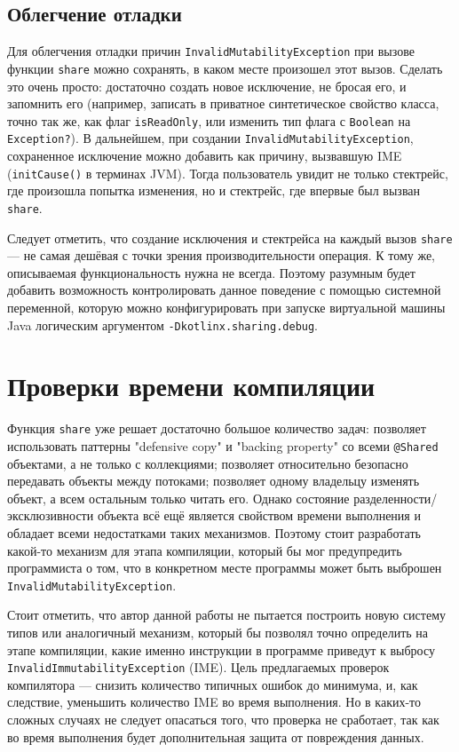 \documentclass[specification,annotation,times]{itmo-student-thesis}
\begin{document}
\subsection{Облегчение отладки}

Для облегчения отладки причин \texttt{InvalidMutabilityException} при вызове функции \texttt{share} можно сохранять, в каком месте произошел этот вызов.
Сделать это очень просто: достаточно создать новое исключение, не бросая его, и запомнить его (например, записать в приватное синтетическое свойство класса, точно так же, как флаг \texttt{isReadOnly}, или изменить тип флага с \texttt{Boolean} на \texttt{Exception?}).
В дальнейшем, при создании \texttt{InvalidMutabilityException}, сохраненное исключение можно добавить как причину, вызвавшую IME (\texttt{initCause()} в терминах JVM).
Тогда пользователь увидит не только стектрейс, где произошла попытка изменения, но и стектрейс, где впервые был вызван \texttt{share}.

Следует отметить, что создание исключения и стектрейса на каждый вызов \texttt{share} --- не самая дешёвая с точки зрения производительности операция.
К тому же, описываемая функциональность нужна не всегда. Поэтому разумным будет добавить возможность контролировать данное поведение с помощью системной переменной, которую можно конфигурировать при запуске виртуальной машины Java логическим аргументом \texttt{-Dkotlinx.sharing.debug}.

\section{Проверки времени компиляции}\label{compile_checks}

Функция \texttt{share} уже решает достаточно большое количество задач: позволяет использовать паттерны "defensive copy" и "backing property" со всеми \texttt{@Shared} объектами, а не только с коллекциями; позволяет относительно безопасно передавать объекты между потоками; позволяет одному владельцу изменять объект, а всем остальным только читать его.
Однако состояние разделенности/эксклюзивности объекта всё ещё является свойством времени выполнения и обладает всеми недостатками таких механизмов. 
Поэтому стоит разработать какой-то механизм для этапа компиляции, который бы мог предупредить программиста о том, что в конкретном месте программы может быть выброшен \texttt{InvalidMutabilityException}.

Стоит отметить, что автор данной работы не пытается построить новую систему типов или аналогичный механизм, который бы позволял точно определить на этапе компиляции, какие именно инструкции в программе приведут к выбросу \texttt{InvalidImmutabilityException} (IME).
Цель предлагаемых проверок компилятора --- снизить количество типичных ошибок до минимума, и, как следствие, уменьшить количество IME во время выполнения.
Но в каких-то сложных случаях не следует опасаться того, что проверка не сработает,
так как во время выполнения будет дополнительная защита от повреждения данных.
\end{document}
